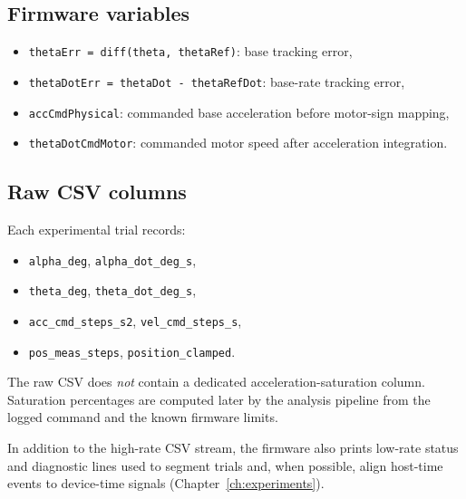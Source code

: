 \subsection*{Firmware variables}
\begin{itemize}
  \item \texttt{thetaErr = diff(theta, thetaRef)}: base tracking error,
  \item \texttt{thetaDotErr = thetaDot - thetaRefDot}: base-rate tracking error,
  \item \texttt{accCmdPhysical}: commanded base acceleration before motor-sign mapping,
  \item \texttt{thetaDotCmdMotor}: commanded motor speed after acceleration integration.
\end{itemize}

\subsection*{Raw CSV columns}
Each experimental trial records:
\begin{itemize}
  \item \texttt{alpha\_deg}, \texttt{alpha\_dot\_deg\_s},
  \item \texttt{theta\_deg}, \texttt{theta\_dot\_deg\_s},
  \item \texttt{acc\_cmd\_steps\_s2}, \texttt{vel\_cmd\_steps\_s},
  \item \texttt{pos\_meas\_steps}, \texttt{position\_clamped}.
\end{itemize}
The raw CSV does \emph{not} contain a dedicated acceleration-saturation column. Saturation percentages are computed later by the analysis pipeline from the logged command and the known firmware limits.

In addition to the high-rate CSV stream, the firmware also prints low-rate status and diagnostic lines used to segment trials and, when possible, align host-time events to device-time signals (Chapter~\ref{ch:experiments}).
